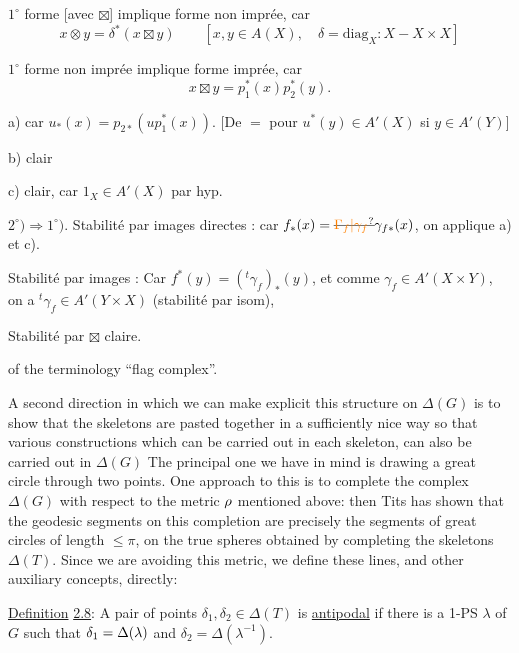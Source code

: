 $1^\circ$ forme  [avec $\boxtimes$] implique forme non imprée, car
\[
 x\otimes y=\delta^*(x\boxtimes y)\qquad[x,y\in A(X),\quad\delta=\mathrm{diag}_X\colon X\mathbin{-}X\times X]
\]

$1^\circ$ forme non imprée implique forme imprée, car
\[
 x\boxtimes y=p_1^*(x)p_2^*(y).
\]

a) car $u_*(x)=p_{2*}(u p_1^*(x))$. [De $=$ pour $u^*(y)\in A'(X)$ si $y\in A'(Y)$]

b) clair

c) clair, car $1_X\in A'(X)$ par hyp.

$2^\circ)\Longrightarrow 1^\circ)$. Stabilité par images  directes : car $f_*(x)=\deleted{\unsure{\Gamma_f|\gamma_f}}\gamma_{f*}(x)$, on applique a) et c).

Stabilité par images   : Car $f^*(y)=({}^{t}\gamma_f)_*(y)$, et comme $\gamma_f\in A'(X\times Y)$, on a $ {}^{t}\gamma_f\in A'(Y\times X)$ (stabilité par isom),

Stabilité par $\boxtimes$ claire.

of the terminology ``flag complex''.

A second direction in which we can make explicit this structure on $\Delta(G)$ is to show that the skeletons are pasted together in a sufficiently nice way so that various constructions which can be carried out in each skeleton, can also be carried out in $\Delta(G)$ The principal one we have in mind is drawing a great circle through two points. One approach to this is to complete the complex $\Delta(G)$ with respect to the metric $\rho$ mentioned above: then Tits has shown that the geodesic segments on this completion are precisely the segments of great circles of length $\leq\pi$, on the true spheres obtained by completing the skeletons $\Delta(T)$. Since we are avoiding this metric, we define these lines, and other auxiliary concepts, directly:

\uline{Definition} \uline{2.8}: A pair of points $\delta_1,\delta_2\in\Delta(T)$ is \uline{antipodal} if there is a 1-PS $\lambda$ of $G$ such that $\delta_1=\Delta(\lambda)$ and $\delta_2=\Delta(\lambda^{-1})$.

